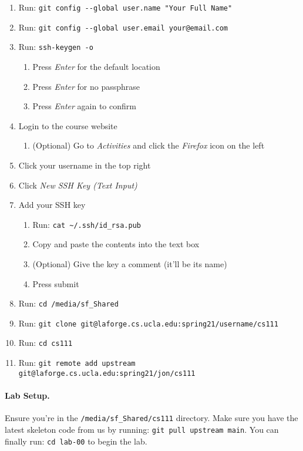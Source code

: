 \begin{enumerate}
  \item Run: \lstinline|git config --global user.name "Your Full Name"|
  \item Run: \lstinline|git config --global user.email your@email.com|
  \item Run: \lstinline|ssh-keygen -o|
    \begin{enumerate}
      \item Press \textit{Enter} for the default location
      \item Press \textit{Enter} for no passphrase
      \item Press \textit{Enter} again to confirm
    \end{enumerate}
  \item Login to the course website
    \begin{enumerate}
      \item (Optional) Go to \textit{Activities} and click the \textit{Firefox}
            icon on the left
    \end{enumerate}
  \item Click your username in the top right
  \item Click \textit{New SSH Key (Text Input)}
  \item Add your SSH key
    \begin{enumerate}
      \item Run: \lstinline|cat ~/.ssh/id_rsa.pub|
      \item Copy and paste the contents into the text box
      \item (Optional) Give the key a comment (it'll be its name)
      \item Press submit
    \end{enumerate}
  
  \item Run: \lstinline|cd /media/sf_Shared|
  \item Run: \lstinline|git clone git@laforge.cs.ucla.edu:spring21/username/cs111|
  \item Run: \lstinline|cd cs111|
  \item Run: \lstinline|git remote add upstream git@laforge.cs.ucla.edu:spring21/jon/cs111|
\end{enumerate}

\paragraph{Lab Setup.}
Ensure you're in the \lstinline|/media/sf_Shared/cs111| directory. Make sure you
have the latest skeleton code from us by running:
\lstinline|git pull upstream main|.
You can finally run: \lstinline|cd lab-00| to begin the lab.

